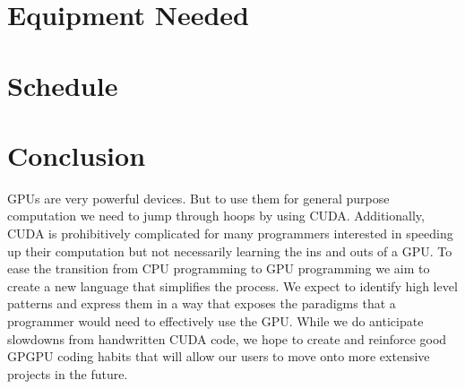 \documentclass{article}
\begin{document}
\section{Equipment Needed}

\section{Schedule}

\section{Conclusion}

GPUs are very powerful devices. But to use them for general purpose computation we need to jump through hoops by using CUDA. Additionally, CUDA is prohibitively complicated for many programmers interested in speeding up their computation but not necessarily learning the ins and outs of a GPU. To ease the transition from CPU programming to GPU programming we aim to create a new language that simplifies the process. We expect to identify high level patterns and express them in a way that exposes the paradigms that a programmer would need to effectively use the GPU. While we do anticipate slowdowns from handwritten CUDA code, we hope to create and reinforce good GPGPU coding habits that will allow our users to move onto more extensive projects in the future.




\end{document}
